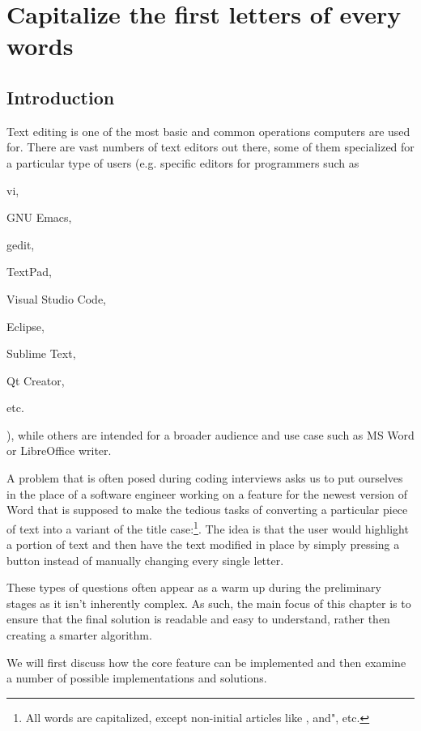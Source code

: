 %

\chapter{Capitalize the first letters of every words}
\label{ch:capitalize_words_first_letter}
\section*{Introduction}
Text editing is one of the most basic and common operations computers are used for. There are vast numbers of text editors out there, some of them specialized for a particular type of users (e.g. specific editors for programmers such as \begin{enumerate*}
	\item vi,
	\item GNU Emacs,
	\item gedit,
	\item TextPad,
	\item Visual Studio Code,
	\item Eclipse,
	\item Sublime Text,
	\item Qt Creator,
	\item etc.
\end{enumerate*}
), while others are intended for a broader audience and use case such as  MS Word or LibreOffice writer. 


A problem that is often posed during coding interviews asks us to put ourselves in the place of a software engineer working on a feature for the newest version of Word that is supposed to make the tedious tasks of converting a particular piece of text into a variant of the title case:\footnote{All words are capitalized, except non-initial articles like , and", etc.}.
The idea is that the user would highlight a portion of text and then have the text modified in place by simply pressing a button instead of manually changing every single letter. 


These types of questions often appear as a warm up during the preliminary stages as it isn't inherently complex.  As such, the main focus of this chapter is to ensure that the final solution is readable and easy to understand, rather then creating a smarter algorithm. 

We will first discuss how the core feature can be implemented and then examine a number of possible implementations and solutions. 


